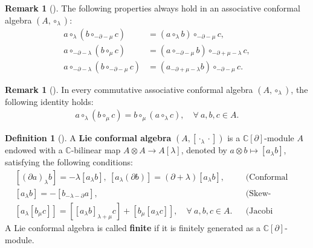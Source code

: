 \documentclass[11pt,letterpaper,reqno]{amsart}
\theoremstyle{definition}
\newtheorem{definition}[theorem]{Definition}
\newtheorem{remark}[theorem]{Remark}
\numberwithin{equation}{section}
\begin{document}
\begin{remark}[{\cite{DAK98}}]\label{rem1}%
   The following properties always hold in an associative conformal algebra $(A,\circ_\lambda)$:
   \begin{align}
         a\circ_{\lambda}(b\circ_{-\partial-\mu}c) & =(a\circ_{\lambda}b)\circ_{-\partial-\mu}c, \\
         a\circ_{-\partial-\lambda}(b\circ_{\mu}c) & =(a\circ_{-\partial-\mu}b)\circ_{-\partial+\mu-\lambda}c, \\
         a\circ_{-\partial-\lambda}(b\circ_{-\partial-\mu}c) & =(a_{-\partial+\mu-\lambda}b)\circ_{-\partial-\mu}c.
   \end{align}
\end{remark}
\begin{remark}[{\cite{KN23}}] \label{rem3}
   In every commutative associative conformal algebra $(A,\circ_\lambda)$, the following identity holds:
   \begin{align}
      a\circ_\lambda\left(b\circ_\mu c\right)=b\circ_\mu\left(a\circ_\lambda c\right),\quad \forall ~a,b,c\in {A}.
   \end{align}
\end{remark}

\begin{definition}[{\cite{BKV99}}]
A {\bf Lie conformal algebra} $(A,[\cdot_{\lambda}\cdot])$ is a $\mathbb{C}[\partial]$-module $A$ endowed with a $\mathbb{C}$-bilinear map $A\otimes A\to A[\lambda]$, denoted by $a\otimes b\mapsto [a_{\lambda}b]$, satisfying the following conditions:
   \begin{align}
        &[(\partial a)_{\lambda}b]=-\lambda[a_{\lambda}b],~[a_{\lambda}(\partial b)]=(\partial+\lambda)[a_{\lambda}b], &&\text{(Conformal sesquilinearity)}\\
        &[a_{\lambda}b]=-[b_{-\lambda-\partial}a], &&\text{(Skew-symmetry)}\\
        &[a_{\lambda}[b_{\mu}c]]=[[a_{\lambda}b]_{\lambda+\mu}c]+[b_{\mu}[a_{\lambda}c]], \quad \forall ~a,b,c\in {A}.&&\text{(Jacobi identity)} \label{Jacobi}
   \end{align}
A Lie conformal algebra is called {\bf finite} if it is finitely generated as a $\mathbb{C}[\partial]$-module.
\end{definition}
\end{document}
